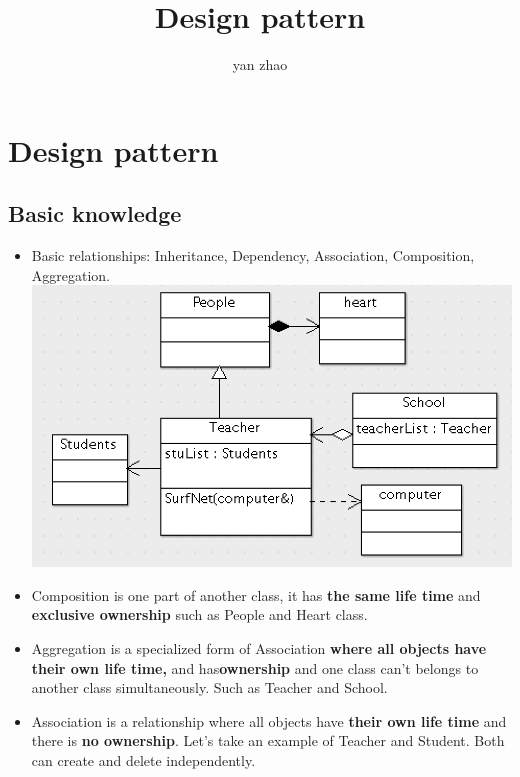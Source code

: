 \documentclass[a4paper,12pt,twoside]{book}
\begin{document}
\title{Design pattern }
\author{yan zhao}
\date{}\maketitle

\else
\chapter{Design pattern } 
\fi

\section{Basic knowledge}
\begin{itemize}
\item Basic relationships: Inheritance, Dependency, Association, Composition, Aggregation.  \\
\includegraphics[scale=0.8]{pics/fig.png}

\item Composition is one part of another class, it has \textbf{the same life time} and \textbf{exclusive ownership} such as People and Heart class.

\item Aggregation is a specialized form of Association \textbf{where all objects have their own life time,} and has\textbf{ownership} and one class can't belongs to another class simultaneously. Such as Teacher and School. 

\item Association is a relationship where all objects have \textbf{their own life time} and there is \textbf{no ownership}. Let's take an example of Teacher and Student. Both can create and delete independently.


\end{itemize}
\end{document}
